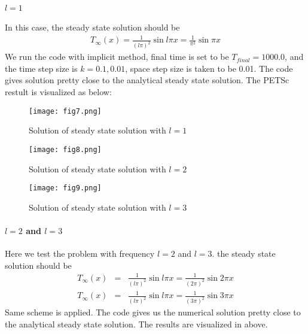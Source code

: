 \documentclass[a4paper,12pt]{article}
\begin{document}
\paragraph{\(l=1\)}
In this case, the steady state solution should be 
\begin{eqnarray}
T_{\infty}(x) = \frac{1}{(l\pi)^{2}}\sin{l\pi x} = \frac{1}{\pi^{2}}\sin{\pi x}
\end{eqnarray}
We run the code with implicit method, final time is set to be \(T_{final} = 1000.0\), and the time step size is \(k = 0.1, 0.01\), space step size is taken to be 0.01. The code gives solution pretty close to the analytical steady state solution. The PETSc restult is visualized as below:
\begin{figure}[H]
\begin{center}
\texttt{[image: fig7.png]}
\caption{Solution of steady state solution with \(l=1\)}
\end{center}
\end{figure}

\begin{figure}[H]
\begin{center}
\texttt{[image: fig8.png]}
\caption{Solution of steady state solution with \(l=2\)}
\end{center}
\end{figure}

\begin{figure}[H]
\begin{center}
\texttt{[image: fig9.png]}
\caption{Solution of steady state solution with \(l=3\)}
\end{center}
\end{figure}

\paragraph{\(l=2\) and \(l=3\)}
Here we test the problem with frequency \(l=2\) and \(l=3\). the steady state solution should be 
\begin{eqnarray}
T_{\infty}(x) &=& \frac{1}{(l\pi)^{2}}\sin{l\pi x} = \frac{1}{(2\pi)^{2}}\sin{2\pi x} \\
T_{\infty}(x) &=& \frac{1}{(l\pi)^{2}}\sin{l\pi x} = \frac{1}{(3\pi)^{2}}\sin{3\pi x}
\end{eqnarray}
Same scheme is applied. The code gives us the numerical solution pretty close to the analytical steady state solution. The results are visualized in above.\\
\end{document}
